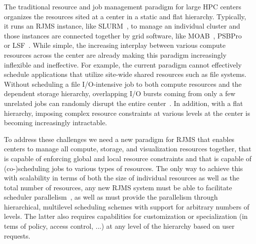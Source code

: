 The traditional resource and job management paradigm
for large HPC centers organizes the resources sited
at a center in a static and flat hierarchy. Typically, it 
runs an RJMS instance, like SLURM~\cite{Jette02slurm}, to manage an individual cluster
and those instances are connected together by 
grid software, like MOAB~\cite{MOAB}, PSBPro~\cite{PSBPro} or LSF~\cite{LSF}.
While simple, the increasing interplay 
between various compute resources across the center
are already making this paradigm increasingly 
inflexible and ineffective. 
For example, the current paradigm cannot effectively
schedule applications that utilize site-wide shared 
resources such as file systems. 
Without scheduling a file I/O-intensive job 
to both compute resources and the dependent storage 
hierarchy, overlapping I/O bursts coming from only a few
unrelated jobs can randomly disrupt the entire center~\cite{SCR,SPINDLE}. 
In addition, with a flat hierarchy, imposing complex 
resource constraints at various levels at the center
is becoming increasingly intractable. 

To address these challenges we need 
a new paradigm for RJMS that enables centers to manage
all compute, storage, and visualization resources together, 
that is capable of enforcing global and local resource constraints
and that
is capable of 
(co-)scheduling jobs to various types of resources.
The only way to achieve this with scalability in terms of both the size of individual resources
as well as the total number of resources, any new RJMS system must be able to
facilitate 
scheduler parallelism~\cite{Omega,Mesos}, as well as must
provide the parallelism through hierarchical, multilevel 
scheduling schemes with support for arbitrary numbers of levels.
The latter also requires capabilities for customization or specialization (in tems
of policy, access control, ...) at any level of the hierarchy based on user requests.

